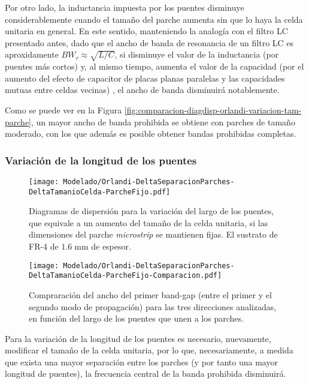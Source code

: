 Por otro lado, la inductancia impuesta por los puentes disminuye considerablemente cuando el tamaño del parche aumenta sin que lo haya la celda unitaria en general. En este sentido, manteniendo la analogía con el filtro LC presentado antes, dado que el ancho de banda de resonancia de un filtro LC es aproxidamente $BW_r \approx \sqrt{L/C}$, si disminuye el valor de la inductancia (por puentes más cortos) y, al mismo tiempo, aumenta el valor de la capacidad (por el aumento del efecto de capacitor de placas planas paralelas y las capacidades mutuas entre celdas vecinas) , el ancho de banda disminuirá notablemente.

Como se puede ver en la Figura \ref{fig:comparacion-diagdisp-orlandi-variacion-tam-parche}, un mayor ancho de banda prohibida se obtiene con parches de tamaño moderado, con los que además es posible obtener bandas prohibidas completas.


\subsubsection{Variación de la longitud de los puentes}


\begin{figure}[h]
	\centering
  	\texttt{[image: Modelado/Orlandi-DeltaSeparacionParches-DeltaTamanioCelda-ParcheFijo.pdf]}
	\caption{Diagramas de dispersión para la variación del largo de los puentes, que equivale a un aumento del tamaño de la celda unitaria, si las dimensiones del parche \textit{microstrip} se mantienen fijas. El sustrato de FR-4 de $1.6\;\text{mm}$ de espesor.}
	\label{fig:diagdisp-orlandi-variacion-long-puentes}
\end{figure}



\begin{figure}[h]
	\centering
	\texttt{[image: Modelado/Orlandi-DeltaSeparacionParches-DeltaTamanioCelda-ParcheFijo-Comparacion.pdf]}
	\caption{Compraración del ancho del primer band-gap (entre el primer y el segundo modo de propagación) para las tres direcciones analizadas, en función del largo de los puentes que unen a los parches.}
	\label{fig:comparacion-diagdisp-orlandi-long-puentes}
\end{figure}


Para la variación de la longitud de los puentes es necesario, nuevamente, modificar el tamaño de la celda unitaria, por lo que, necesariamente, a medida que exista una mayor separación entre los parches (y por tanto una mayor longitud de puentes), la frecuencia central de la banda prohibida disminuirá.

